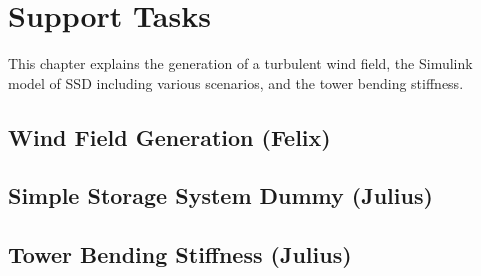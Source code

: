 \chapter{Support Tasks}
This chapter explains the generation of a turbulent wind field, the Simulink model of \gls{SSD} including various scenarios, and the tower bending stiffness.
\section{Wind Field Generation (Felix)}


\section{Simple Storage System Dummy (Julius)}


\section{Tower Bending Stiffness (Julius)}



